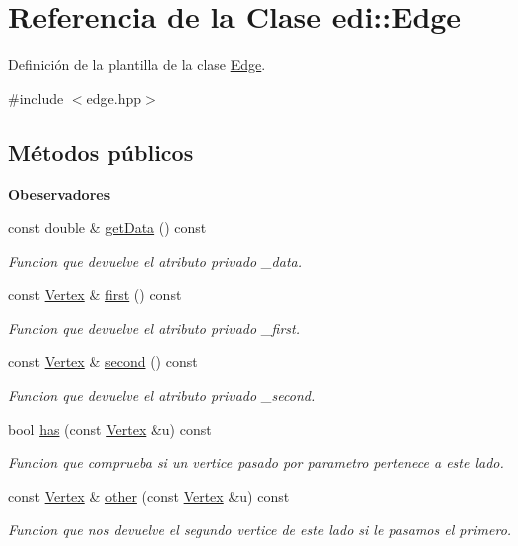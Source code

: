 \hypertarget{classedi_1_1Edge}{}\section{Referencia de la Clase edi\+:\+:Edge}
\label{classedi_1_1Edge}


Definición de la plantilla de la clase \hyperlink{classedi_1_1Edge}{Edge}.  




{\ttfamily \#include $<$edge.\+hpp$>$}

\subsection*{Métodos públicos}
\begin{Indent}{\bf Obeservadores}\par
\begin{DoxyCompactItemize}
\item 
const double \& \hyperlink{classedi_1_1Edge_a9f7781b3ddf74081fb3b4d8ad91de32f}{get\+Data} () const 
\begin{DoxyCompactList}\small\item\em Funcion que devuelve el atributo privado \+\_\+data. \end{DoxyCompactList}\item 
const \hyperlink{classedi_1_1Vertex}{Vertex} \& \hyperlink{classedi_1_1Edge_a60f6ec38ddb0d047153617a9258c35e2}{first} () const 
\begin{DoxyCompactList}\small\item\em Funcion que devuelve el atributo privado \+\_\+first. \end{DoxyCompactList}\item 
const \hyperlink{classedi_1_1Vertex}{Vertex} \& \hyperlink{classedi_1_1Edge_ad7e0b8a3a7cb9b3e308e37348468c883}{second} () const 
\begin{DoxyCompactList}\small\item\em Funcion que devuelve el atributo privado \+\_\+second. \end{DoxyCompactList}\item 
bool \hyperlink{classedi_1_1Edge_aa4e3c3020eac39e526e440e515259126}{has} (const \hyperlink{classedi_1_1Vertex}{Vertex} \&u) const 
\begin{DoxyCompactList}\small\item\em Funcion que comprueba si un vertice pasado por parametro pertenece a este lado. \end{DoxyCompactList}\item 
const \hyperlink{classedi_1_1Vertex}{Vertex} \& \hyperlink{classedi_1_1Edge_a90bd31b0a420e4c3a0f80db2a542ee01}{other} (const \hyperlink{classedi_1_1Vertex}{Vertex} \&u) const 
\begin{DoxyCompactList}\small\item\em Funcion que nos devuelve el segundo vertice de este lado si le pasamos el primero. \end{DoxyCompactList}\end{DoxyCompactItemize}
\end{Indent}

